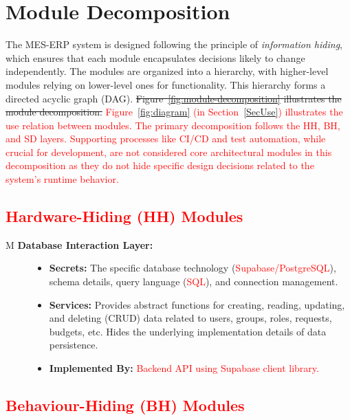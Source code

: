 \documentclass[12pt, titlepage]{article}
\newcounter{mnum}
\newcommand{\mthemnum}{M\themnum}
\begin{document}
\section{Module Decomposition} \label{SecMD}

The MES-ERP system is designed following the principle of \textit{information hiding}, which ensures that each module encapsulates decisions likely to change independently. The modules are organized into a hierarchy, with higher-level modules relying on lower-level ones for functionality. This hierarchy forms a directed acyclic graph (DAG). \sout{Figure~\ref{fig:module-decomposition} illustrates the module decomposition.} \textcolor{red}{Figure~\ref{fig:diagram} (in Section~\ref{SecUse}) illustrates the use relation between modules. The primary decomposition follows the HH, BH, and SD layers.} \textcolor{red}{Supporting processes like CI/CD and test automation, while crucial for development, are not considered core architectural modules in this decomposition as they do not hide specific design decisions related to the system's runtime behavior.}

\subsection{\textcolor{red}{Hardware-Hiding (HH) Modules}}

\begin{description}
\item[ \mthemnum \label{mDB} \textbf{Database Interaction Layer:}]
    \begin{itemize}
        \item \textbf{Secrets:} The specific database technology (\textcolor{red}{Supabase/PostgreSQL}), schema details, query language (\textcolor{red}{SQL}), and connection management.
        \item \textbf{Services:} Provides abstract functions for creating, reading, updating, and deleting (CRUD) data related to users, groups, roles, requests, budgets, etc. Hides the underlying implementation details of data persistence.
        \item \textbf{Implemented By:} \textcolor{red}{Backend API using Supabase client library.}
    \end{itemize}
\end{description}

\subsection{\textcolor{red}{Behaviour-Hiding (BH) Modules}}
\end{document}
